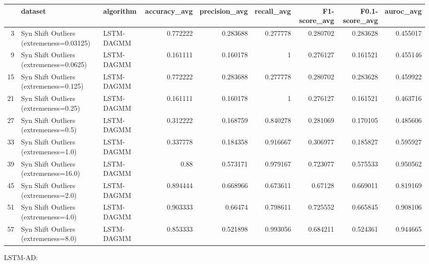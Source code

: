 \begin{tabular}{rllrrrrrr}
\hline
    & dataset                                  & algorithm   &   accuracy\_avg &   precision\_avg &   recall\_avg &   F1-score\_avg &   F0.1-score\_avg &   auroc\_avg \\
\hline
  3 & Syn Shift Outliers (extremeness=0.03125) & LSTM-DAGMM  &       0.772222 &        0.283688 &     0.277778 &       0.280702 &         0.283628 &    0.455017 \\
  9 & Syn Shift Outliers (extremeness=0.0625)  & LSTM-DAGMM  &       0.161111 &        0.160178 &     1        &       0.276127 &         0.161521 &    0.455146 \\
 15 & Syn Shift Outliers (extremeness=0.125)   & LSTM-DAGMM  &       0.772222 &        0.283688 &     0.277778 &       0.280702 &         0.283628 &    0.459922 \\
 21 & Syn Shift Outliers (extremeness=0.25)    & LSTM-DAGMM  &       0.161111 &        0.160178 &     1        &       0.276127 &         0.161521 &    0.463716 \\
 27 & Syn Shift Outliers (extremeness=0.5)     & LSTM-DAGMM  &       0.312222 &        0.168759 &     0.840278 &       0.281069 &         0.170105 &    0.485606 \\
 33 & Syn Shift Outliers (extremeness=1.0)     & LSTM-DAGMM  &       0.337778 &        0.184358 &     0.916667 &       0.306977 &         0.185827 &    0.595927 \\
 39 & Syn Shift Outliers (extremeness=16.0)    & LSTM-DAGMM  &       0.88     &        0.573171 &     0.979167 &       0.723077 &         0.575533 &    0.950562 \\
 45 & Syn Shift Outliers (extremeness=2.0)     & LSTM-DAGMM  &       0.894444 &        0.668966 &     0.673611 &       0.67128  &         0.669011 &    0.819169 \\
 51 & Syn Shift Outliers (extremeness=4.0)     & LSTM-DAGMM  &       0.903333 &        0.66474  &     0.798611 &       0.725552 &         0.665845 &    0.908106 \\
 57 & Syn Shift Outliers (extremeness=8.0)     & LSTM-DAGMM  &       0.853333 &        0.521898 &     0.993056 &       0.684211 &         0.524361 &    0.944665 \\
\hline
\end{tabular}

LSTM-AD:

